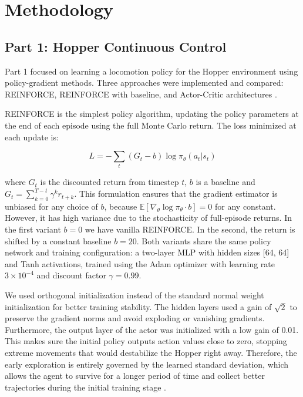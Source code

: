 \section{Methodology}
\subsection{Part 1: Hopper Continuous Control}

Part 1 focused on learning a locomotion policy for the Hopper environment using policy-gradient methods.
Three approaches were implemented and compared: REINFORCE, REINFORCE with baseline, and Actor-Critic architectures \cite{SuttonBarto2018}.

REINFORCE \cite{Williams1992} is the simplest policy algorithm, updating the policy parameters at the end of each episode using the full Monte Carlo return. The loss minimized at each update is:

\[
L = -\sum_t \left(G_t - b\right) \log \pi_\theta(a_t | s_t)
\]



where $G_t$ is the discounted return from timestep $t$, $b$ is a baseline and $G_t = \sum_{k=0}^{T-t} \gamma^k r_{t+k}$. This formulation ensures that the gradient estimator is unbiased for any choice of $b$, because $\mathbb{E}[\nabla_\theta \log \pi_\theta \cdot b] = 0$ for any constant. However, it has high variance due to the stochasticity of full-episode returns. In the first variant $b=0$ we have vanilla REINFORCE. In the second, the return is shifted by a constant baseline $b = 20$.
Both variants share the same policy network and training configuration: a two-layer MLP with hidden sizes [64, 64] and Tanh activations, trained using the Adam optimizer with learning rate $3 \times 10^{-4}$ and discount factor $\gamma = 0.99$.

We used orthogonal initialization \cite{saxe2013exact} instead of the standard normal weight initialization for better training stability. The hidden layers used a gain of $\sqrt{2}$ to preserve the gradient norms and avoid exploding or vanishing gradients. Furthermore, the output layer of the actor was initialized with a low gain of 0.01. This makes sure the initial policy outputs action values close to zero, stopping extreme movements that would destabilize the Hopper right away. Therefore, the early exploration is entirely governed by the learned standard deviation, which allows the agent to survive for a longer period of time and collect better trajectories during the initial training stage \cite{andrychowicz2020matters}.

